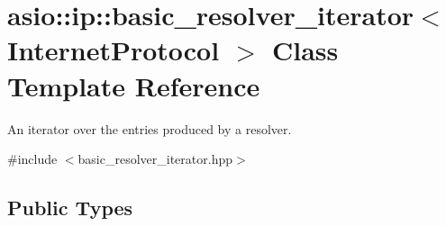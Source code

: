 \hypertarget{classasio_1_1ip_1_1basic__resolver__iterator}{}\section{asio\+:\+:ip\+:\+:basic\+\_\+resolver\+\_\+iterator$<$ Internet\+Protocol $>$ Class Template Reference}
\label{classasio_1_1ip_1_1basic__resolver__iterator}


An iterator over the entries produced by a resolver.  




{\ttfamily \#include $<$basic\+\_\+resolver\+\_\+iterator.\+hpp$>$}

\subsection*{Public Types}
